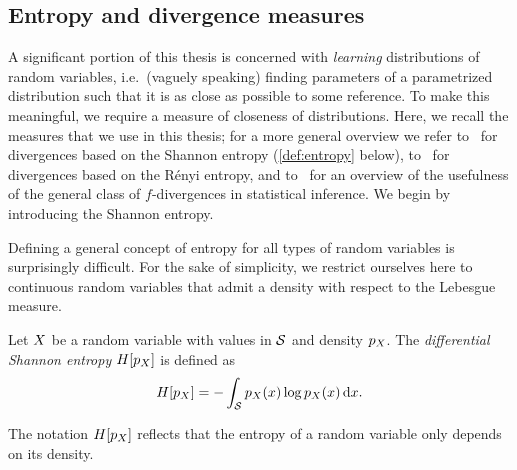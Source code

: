 \subsection{Entropy and divergence measures}
A significant portion of this thesis is concerned with \emph{learning} distributions of random variables, i.e.\ (vaguely speaking) finding parameters of a parametrized distribution such that it is as close as possible to some reference.
To make this meaningful, we require a measure of closeness of distributions.
Here, we recall the measures that we use in this thesis; for a more general overview we refer to~\cite{lin_divergence_1991} for divergences based on the Shannon entropy (\cref{def:entropy} below), to~\cite{erven_renyi_2014} for divergences based on the Rényi entropy, and to~\cite{Csiszar1991} for an overview of the usefulness of the general class of \( f \)-divergences in statistical inference.
We begin by introducing the Shannon entropy.

Defining a general concept of entropy for all types of random variables is surprisingly difficult.
For the sake of simplicity, we restrict ourselves here to continuous random variables that admit a density with respect to the Lebesgue measure.
\begin{definition}
	\label{def:entropy}
	Let \( X \) be a random variable with values in \( \mathcal{S} \) and density \( p_X \).
	The \emph{differential Shannon entropy} \( H[p_X] \) is defined as
	\begin{equation}
		H[p_X] = -\int_{\mathcal{S}} p_X(x) \log p_X(x)\,\mathrm{d}x.
	\end{equation}
\end{definition}
The notation \( H[p_X] \) reflects that the entropy of a random variable only depends on its density.

